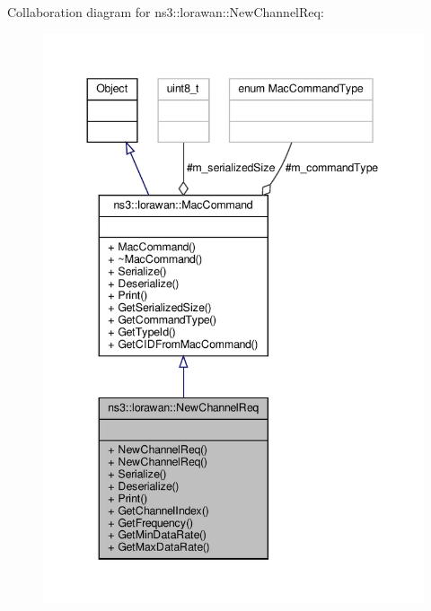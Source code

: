 Collaboration diagram for ns3\+:\+:lorawan\+:\+:New\+Channel\+Req\+:
\nopagebreak
\begin{figure}[H]
\begin{center}
\leavevmode
\includegraphics[width=343pt]{classns3_1_1lorawan_1_1NewChannelReq__coll__graph}
\end{center}
\end{figure}
